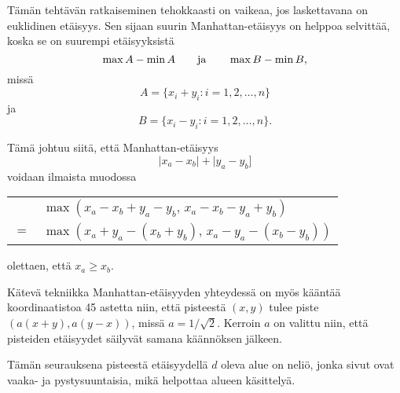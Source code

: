 Tämän tehtävän ratkaiseminen tehokkaasti on vaikeaa,
jos laskettavana on euklidinen etäisyys.
Sen sijaan suurin Manhattan-etäisyys on helppoa selvittää,
koska se on suurempi etäisyyksistä
\[\max A - \min A \hspace{20px} \textrm{ja} \hspace{20px} \max B - \min B,\]
missä
\[A = \{x_i+y_i : i = 1,2,\ldots,n\}\]
ja
\[B = \{x_i-y_i : i = 1,2,\ldots,n\}.\]
\begin{samepage}
Tämä johtuu siitä, että Manhattan-etäisyys
\[|x_a-x_b|+|y_a-y_b]\]
voidaan ilmaista muodossa
\begin{center}
\begin{tabular}{cl}
& $\max(x_a-x_b+y_a-y_b,\,x_a-x_b-y_a+y_b)$ \\
$=$ & $\max(x_a+y_a-(x_b+y_b),\,x_a-y_a-(x_b-y_b))$
\end{tabular}
\end{center}
olettaen, että $x_a \ge x_b$.
\end{samepage}

\begin{samepage}
Kätevä tekniikka Manhattan-etäisyyden yhteydessä on myös
kääntää koordinaatistoa 45 astetta
niin, että pisteestä $(x,y)$ tulee piste $(a(x+y),a(y-x))$,
missä $a=1/\sqrt{2}$.
Kerroin $a$ on valittu niin, että
pisteiden etäisyydet säilyvät samana käännöksen jälkeen.

Tämän seurauksena pisteestä etäisyydellä $d$ oleva alue
on neliö, jonka sivut ovat vaaka- ja pystysuuntaisia,
mikä helpottaa alueen käsittelyä.
\begin{center}
\end{center}
\end{samepage}

